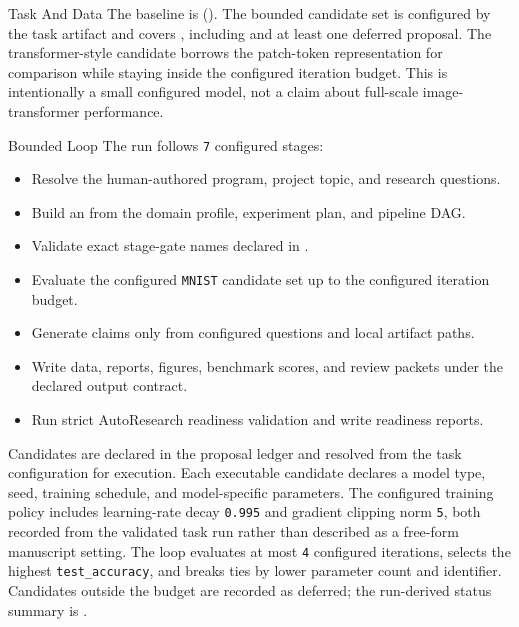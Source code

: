 \documentclass[
  ignorenonframetext,
]{beamer}
\providecommand{\tightlist}{%
  \setlength{\itemsep}{0pt}\setlength{\parskip}{0pt}}
\begin{document}
\begin{frame}{Task And Data}
The baseline is 
(). The bounded candidate set is configured by
the task artifact and covers
,
including  and at least one
deferred proposal. The transformer-style candidate borrows the
patch-token representation for comparison while staying inside the
configured iteration budget. This is intentionally a small configured
model, not a claim about full-scale image-transformer performance.
\end{frame}

\begin{frame}{Bounded Loop}
\protect{}\label{sec:bounded-loop}
The run follows \texttt{7} configured stages:

\begin{itemize}
\tightlist
\item
  Resolve the human-authored program, project topic, and research
  questions.
\item
  Build an  from the domain profile, experiment
  plan, and pipeline DAG.
\item
  Validate exact stage-gate names declared in
  .
\item
  Evaluate the configured \texttt{MNIST} candidate set up to the
  configured iteration budget.
\item
  Generate claims only from configured questions and local artifact
  paths.
\item
  Write data, reports, figures, benchmark scores, and review packets
  under the declared output contract.
\item
  Run strict AutoResearch readiness validation and write readiness
  reports.
\end{itemize}

Candidates are declared in the proposal ledger and resolved from the
task configuration for execution. Each executable candidate declares a
model type, seed, training schedule, and model-specific parameters. The
configured training policy includes learning-rate decay \texttt{0.995}
and gradient clipping norm \texttt{5}, both recorded from the validated
task run rather than described as a free-form manuscript setting. The
loop evaluates at most \texttt{4} configured iterations, selects the
highest \texttt{test\_accuracy}, and breaks ties by lower parameter
count and identifier. Candidates outside the budget are recorded as
deferred; the run-derived status summary is
.


\end{frame}
\end{document}
